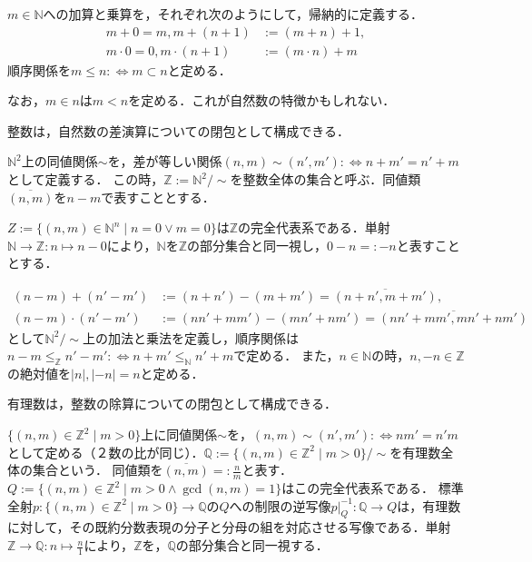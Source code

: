 \documentclass[uplatex,dvipdfmx]{jsreport}
\begin{document}
\begin{definition}
    $m\in\mathbb{N}$への加算と乗算を，それぞれ次のようにして，帰納的に定義する．
    \begin{align*}
        m+0=m, m+(n+1)&:=(m+n)+1,\\
        m\cdot 0=0, m\cdot (n+1)&:=(m\cdot n)+m
    \end{align*}
    順序関係を$m\le n:\Leftrightarrow m\subset n$と定める．
\end{definition}
\begin{remark}
    なお，$m\in n$は$m<n$を定める．これが自然数の特徴かもしれない．
\end{remark}

整数は，自然数の差演算についての閉包として構成できる．
\begin{definition}[Integers]
    $\mathbb{N}^2$上の同値関係$\sim$を，差が等しい関係$(n,m)\sim (n',m'):\Leftrightarrow n+m'=n'+m$として定義する．
    この時，$\mathbb{Z}:=\mathbb{N}^2/\sim$を整数全体の集合と呼ぶ．同値類$\overline{(n,m)}$を$n-m$で表すこととする．

    $Z:=\{(n,m)\in\mathbb{N}^n\mid n=0\lor m=0\}$は$\mathbb{Z}$の完全代表系である．単射$\mathbb{N}\to\mathbb{Z}:n\mapsto n-0$により，$\mathbb{N}$を$\mathbb{Z}$の部分集合と同一視し，$0-n=:-n$と表すこととする．
\end{definition}

\begin{definition}
    \begin{align*}
        (n-m)+(n'-m')&:= (n+n')-(m+m')=\overline{(n+n',m+m')},\\
        (n-m)\cdot (n'-m')&:=(nn'+mm')-(mn'+nm')=\overline{(nn'+mm',mn'+nm')}
    \end{align*}
    として$\mathbb{N}^2/\sim$上の加法と乗法を定義し，順序関係は$n-m\le_\mathbb{Z} n'-m' :\Leftrightarrow n+m'\le_\mathbb{N} n'+m$で定める．
    また，$n\in\mathbb{N}$の時，$n,-n\in\mathbb{Z}$の絶対値を$|n|,|-n|=n$と定める．
\end{definition}

有理数は，整数の除算についての閉包として構成できる．
\begin{definition}
    $\{ (n,m)\in\mathbb{Z}^2\mid m>0 \}$上に同値関係$\sim$を，$(n,m)\sim (n',m'):\Leftrightarrow nm'=n'm$として定める（２数の比が同じ）．$\mathbb{Q}:=\{ (n,m)\in\mathbb{Z}^2\mid m>0 \}/\sim$を有理数全体の集合という．
    同値類を$\overline{(n,m)}=:\frac{n}{m}$と表す．$Q:=\{(n,m)\in\mathbb{Z}^2\mid m>0\land \gcd(n,m)=1\}$はこの完全代表系である．
    標準全射$p:\{ (n,m)\in\mathbb{Z}^2\mid m>0 \}\to\mathbb{Q}$の$Q$への制限の逆写像$p|_Q^{-1}:\mathbb{Q}\to Q$は，有理数に対して，その既約分数表現の分子と分母の組を対応させる写像である．単射$\mathbb{Z}\to\mathbb{Q}:n\mapsto\frac{n}{1}$により，$\mathbb{Z}$を，$\mathbb{Q}$の部分集合と同一視する．
\end{definition}
\end{document}
